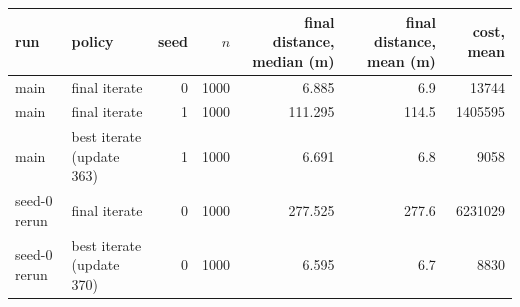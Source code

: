 \begin{tabular}{llrrrrr}
\toprule
run & policy & seed & $n$ & final distance, median (m) & final distance, mean (m) & cost, mean \\
\midrule
main & final iterate & 0 & 1000 & 6.885 & 6.9 & 13744 \\
main & final iterate & 1 & 1000 & 111.295 & 114.5 & 1405595 \\
main & best iterate (update 363) & 1 & 1000 & 6.691 & 6.8 & 9058 \\
seed-0 rerun & final iterate & 0 & 1000 & 277.525 & 277.6 & 6231029 \\
seed-0 rerun & best iterate (update 370) & 0 & 1000 & 6.595 & 6.7 & 8830 \\
\bottomrule
\end{tabular}